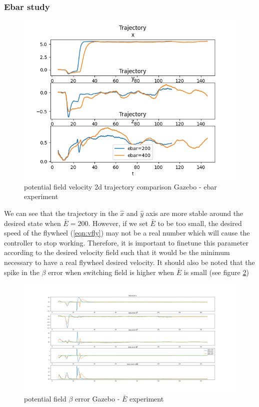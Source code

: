 \subsubsection{Ebar study}
\begin{figure}[h!]
   \centering
   \includegraphics[width=\linewidth]{Images/gazebo_trajectory_ebar_potential_2d.png}
   \caption{potential field velocity 2d trajectory comparison Gazebo - ebar experiment}
   \label{fig:vel2dgazeboebarpotential}
\end{figure}
We can see that the trajectory in the $\hat{x}$ and $\hat{y}$ axis are more stable around the desired state when $\bar{E}=200$.
However, if we set $\bar{E}$ to be too small, the desired speed of the flywheel (\ref{eqn:vfly}) may not be a real number which will cause the controller to stop working.
Therefore, it is important to finetune this parameter according to the desired velocity field such that it would be the minimum necessary to have a real flywheel desired velocity.
It should also be noted that the spike in the $\beta$ error when switching field is higher when $\bar{E}$ is small (see figure \ref{fig:betaerrorgazebopotentialebar})
\begin{figure}[h!]
   \centering
   \includegraphics[width=\linewidth]{Images/gazebo_betaerror_ebar_potential.png}
   \caption{potential field $\beta$ error Gazebo - $\bar{E}$ experiment}
   \label{fig:betaerrorgazebopotentialebar}
\end{figure}


